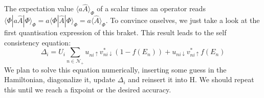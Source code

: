 \documentclass[../main.tex]{subfile}
\begin{document}
The expectation value $\langle a\hat{A}\rangle_{\Phi}$ of a scalar times an operator reads $\langle \Phi|a \hat{A}|\Phi\rangle_{\Phi} = a \langle \Phi|\hat{A}|\Phi\rangle_{\Phi} = a \langle \hat{A}\rangle_{\Phi}$. 
To convince onselves, we just take a look at the first quantisation expression of this braket. This result leads to the self consistency equation:
\begin{equation}\label{eq:SelfConsitentDelta}
    \Delta_i = U_i\sum_{n\in\mathcal{N}_+} u_{ni\uparrow} v_{ni\downarrow}^{\ast} \left(1-f(E_n)\right) + u_{ni\downarrow} v_{ni\uparrow}^{\ast}f(E_n)
\end{equation}
We plan to solve this equation numerically, inserting some guess in the Hamiltonian, diagonalize it, update $\Delta_i$ and reinsert it into H. We should repeat this 
until we reach a fixpoint or the desired accuracy.\\
\end{document}
